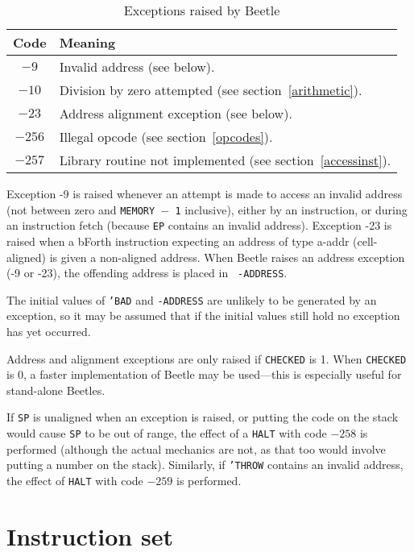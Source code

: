 \documentclass{article}
\newcommand{\spic}[1]{{\spfont\setlength{\baselineskip}{\normalbaselineskip}#1\/}}
\newlength{\opcode}\opcode=0.5in
\begin{document}
\begin{table}[htbp]
\begin{center}
\begin{tabular}{|c|l|} \hline
\rule[-2mm]{0mm}{6mm}\bf Code & \bf Meaning \\ \hline
$-9$ & Invalid address (see below). \\
$-10$ & Division by zero attempted (see section~\ref{arithmetic}). \\
$-23$ & Address alignment exception (see below). \\
$-256$ & Illegal opcode (see section~\ref{opcodes}). \\
$-257$ & Library routine not implemented (see section~\ref{accessinst}). \\ \hline
\end{tabular}
\end{center}
\vspace{-2mm}
\caption{\label{excepttable}Exceptions raised by Beetle}
\end{table}

Exception -9 is raised whenever an attempt is made to access an invalid address
(not between zero and {\tt MEMORY $-$ 1} inclusive), either by an instruction,
or during an instruction fetch (because {\tt EP} contains an invalid address).
Exception -23 is raised when a bForth instruction expecting an address of type
\spic{a-addr} (cell-aligned) is given a non-aligned address. When Beetle raises
an address exception (-9 or -23), the offending address is placed in {\tt
-ADDRESS}.

The initial values of {\tt 'BAD} and {\tt -ADDRESS} are unlikely to be generated
by an exception, so it may be assumed that if the initial values still hold no
exception has yet occurred.

Address and alignment exceptions are only raised if {\tt CHECKED} is 1. When
{\tt CHECKED} is 0, a faster implementation of Beetle may be used---this is
especially useful for stand-alone Beetles.

If {\tt SP} is unaligned when an exception is raised, or putting the code on the
stack would cause {\tt SP} to be out of range, the effect of a {\tt HALT} with
code $-258$ is performed (although the actual mechanics are not, as that too would
involve putting a number on the stack). Similarly, if {\tt 'THROW} contains an
invalid address, the effect of {\tt HALT} with code $-259$ is performed.


\section{Instruction set}
\label{instset}
\end{document}
